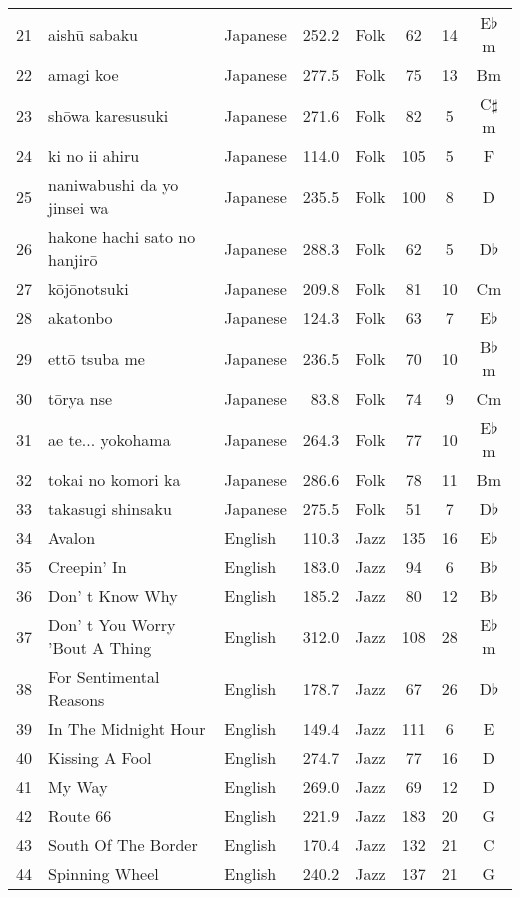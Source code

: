 \begin{table}
{\begin{tabular}{rllrcccc}
		21 & aishū sabaku  & Japanese & 252.2  & Folk & 62 & 14 & E$\flat$ m\\ 
		22 & amagi koe  & Japanese & 277.5  & Folk & 75 & 13 & Bm\\ 
		23 & shōwa karesusuki  & Japanese & 271.6  & Folk & 82 & 5 & C$\sharp$m\\ 
		24 & ki no ii ahiru  & Japanese & 114.0  & Folk & 105 & 5 & F\\ 
		25 & naniwabushi da yo jinsei wa  & Japanese & 235.5  & Folk & 100 & 8 & D\\ 
		26 & hakone hachi sato no hanjirō  & Japanese & 288.3  & Folk & 62 & 5 & D$\flat$\\ 
		27 & kōjōnotsuki  & Japanese & 209.8  & Folk & 81 & 10 & Cm\\ 
		28 & akatonbo  & Japanese & 124.3  & Folk & 63 & 7 & E$\flat$\\ 
		29 & ettō tsuba me  & Japanese & 236.5  & Folk & 70 & 10 & B$\flat$m\\ 
		30 & tōrya nse  & Japanese & 83.8  & Folk & 74 & 9 & Cm\\ 
		31 & ae te... yokohama  & Japanese & 264.3  & Folk & 77 & 10 & E$\flat$m\\ 
		32 & tokai no komori ka  & Japanese & 286.6  & Folk & 78 & 11 & Bm\\ 
		33 & takasugi shinsaku  & Japanese & 275.5  & Folk & 51 & 7 & D$\flat$\\ 
		34 & Avalon  & English & 110.3  & Jazz & 135 & 16 & E$\flat$\\ 
		35 & Creepin' In  & English & 183.0  & Jazz & 94 & 6 & B$\flat$\\ 
		36 & Don' t Know Why  & English & 185.2  & Jazz & 80 & 12 & B$\flat$\\ 
		37 & Don' t You Worry 'Bout A Thing  & English & 312.0  & Jazz & 108 & 28 & E$\flat$m\\ 
		38 & For Sentimental Reasons  & English & 178.7  & Jazz & 67 & 26 & D$\flat$\\ 
		39 & In The Midnight Hour  & English & 149.4  & Jazz & 111 & 6 & E\\ 
		40 & Kissing A Fool  & English & 274.7  & Jazz & 77 & 16 & D\\ 
		41 & My Way  & English & 269.0  & Jazz & 69 & 12 & D\\ 
		42 & Route 66  & English & 221.9  & Jazz & 183 & 20 & G\\ 
		43 & South Of The Border  & English & 170.4  & Jazz & 132 & 21 & C\\ 
		44 & Spinning Wheel  & English & 240.2  & Jazz & 137 & 21 & G\\ 

\end{tabular}}
\end{table}
